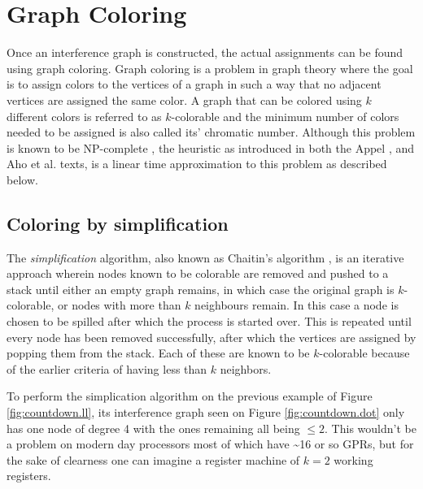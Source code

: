\documentclass{article}
\begin{document}
\section{Graph Coloring}
Once an interference graph is constructed, the actual assignments can be found using graph coloring.
Graph coloring is a problem in graph theory where the goal is to assign colors to the vertices of a graph in such a way that no adjacent vertices are assigned the same color.
A graph that can be colored using \(k\) different colors is referred to as \(k\)-colorable and the minimum number of colors needed to be assigned is also called its' chromatic number.
Although this problem is known to be NP-complete  \cites[229]{tiger}[510]{dragon}, the heuristic as introduced in
both the Appel \cite[229]{tiger}, and Aho et al. \cites[557]{dragon} texts,
is a linear time approximation to this problem as described below.

\subsection{Coloring by simplification}

The \textit{simplification} algorithm, also known as Chaitin's algorithm \cite{chaitin}, 
 is an iterative approach wherein nodes known to be colorable are removed and pushed to a stack until either an empty graph remains, in which case the original graph is \(k\)-colorable,  or nodes with more than \(k\) neighbours remain.
In this case a node is chosen to be spilled after which the process is started over. This is repeated until every node has been removed successfully, after which the vertices are assigned by popping them from the stack. Each of these are known to be \(k\)-colorable because of the earlier criteria of having less than \(k\) neighbors.



To perform the simplication algorithm on the previous example of Figure \ref{fig:countdown.ll}, its interference graph seen on Figure \ref{fig:countdown.dot} only has one node of degree 4 with the ones remaining all being \(\leq 2\). This wouldn't be a problem on modern day processors most of which have \textasciitilde 16 or so GPRs, but for the sake of clearness one can imagine a register machine of \(k=2\) working registers.
\end{document}
